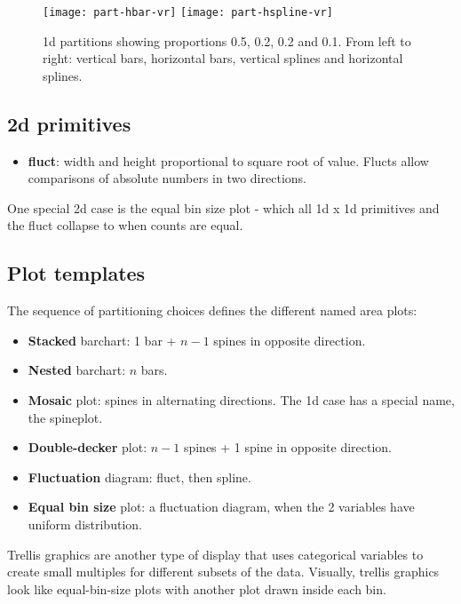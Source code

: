 \documentclass[letterpaper,oneside]{scrartcl}
\begin{document}
\begin{figure}[htbp]
  \centering
    \texttt{[image: part-hbar-vr]}%
    \texttt{[image: part-hspline-vr]}

  \caption{1d partitions showing proportions 0.5, 0.2, 0.2 and 0.1. From left to right: vertical bars, horizontal bars, vertical splines and horizontal splines. }
  \label{fig:part-1d}
\end{figure}


\subsection{2d primitives}

\begin{itemize}
  \item {\bf fluct}: width and height proportional to square root of value. Flucts allow comparisons of absolute numbers in two directions. 
  
\end{itemize}

One special 2d case is the equal bin size plot - which all 1d x 1d primitives and the fluct collapse to when counts are equal. 

\subsection{Plot templates}

The sequence of partitioning choices defines the different named area plots:

\begin{itemize}
  \item {\bf Stacked} barchart: 1 bar + $n-1$ spines in opposite direction.
  \item {\bf Nested} barchart: $n$ bars.
  \item {\bf Mosaic} plot: spines in alternating directions.  The 1d case has a special name, the spineplot. \citep{hartigan:1984,hartigan:1981,friendly:1994,hofmann:2003}
  \item {\bf Double-decker} plot: $n-1$ spines + 1 spine in opposite direction.
  
  \item {\bf Fluctuation} diagram: fluct, then spline. 
  \item {\bf Equal bin size} plot: a fluctuation diagram, when the 2 variables have uniform distribution.
\end{itemize}

Trellis graphics are another type of display that uses categorical variables to create small multiples for different subsets of the data. Visually, trellis graphics look like equal-bin-size plots with another plot drawn inside each bin. 
\end{document}
